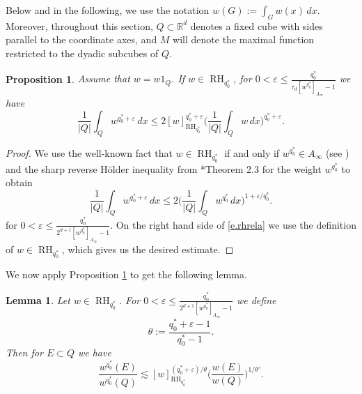 \documentclass[11pt,reqno]{amsart}
\theoremstyle{plain} %
\newtheorem{lemma}[equation]{Lemma}
\newtheorem{proposition}[equation]{Proposition}
\newcommand{\1}{ \mathbbm{1}}   %
\theoremstyle{definition}
\theoremstyle{remark}
\numberwithin{equation}{section}
\begin{document}
Below and in the following, we use the notation $w(G):=\int_Gw(x)\,dx$. Moreover, throughout this section, $Q\subset \mathbb{R}^d$ denotes a fixed cube with sides parallel to the coordinate axes, and $M$ will denote the maximal function restricted to the dyadic subcubes of $Q$.  

\begin{proposition}
\label{prop:srH}
    Assume that $w=w 1_Q$. If $w\in \operatorname{RH}_{q_0^*}$, for $0 < \varepsilon \leq \frac{q_0^*}{\tau_{d} [w^{q_0^*}]_{A_{\infty}}-1 }$ we have
    \begin{equation*}        
    \frac{1}{|Q|} \int_Q w^{q_0^* + \varepsilon} \, dx \le 2[w]_{\operatorname{RH}_{q_0^*}}^{q_0^*+\varepsilon}\Big( \frac{1}{|Q|} \int_Q w \, dx \Big)^{q_0^* + \varepsilon}.
    \end{equation*}
\end{proposition}




\begin{proof}
We use the well-known fact that $w\in \operatorname{RH}_{q_0^*}$ if and only if $w^{q_0^*}\in A_{\infty}$ (see \cite{SW}) and the sharp reverse H\"older inequality from \cite{HPR}*{Theorem 2.3} for the weight $w^{q_0^*}$ to obtain
 \begin{equation}\label{e.rhrela}      
    \frac{1}{|Q|} \int_Q w^{q_0^* + \varepsilon} \, dx \le 2\Big( \frac{1}{|Q|} \int_Q w^{q_0^*} \, dx \Big)^{1 + \varepsilon/q_0^*}.
    \end{equation}
for $0<\varepsilon \leq \frac{q_0^*}{2^{d+1}[w^{q_0^*}]_{A_{\infty}}-1} $. On the right hand side of \eqref{e.rhrela} we use the definition of $w\in \operatorname{RH}_{q_0^*}$, which gives us the desired estimate.
\end{proof}

We now apply Proposition \ref{prop:srH} to get the following lemma.

\begin{lemma}
Let $w\in \operatorname{RH}_{q_0^*}$. 
For  $0 < \varepsilon \leq \frac{q_0^*}{2^{d+1} [w^{q_0^*}]_{A_{\infty}}-1 }$ we define
\begin{equation}
\label{eq:alpha}
\theta:=\frac{q_0^*+\varepsilon-1}{q_0^*-1}.
\end{equation}
Then for $E\subset Q$  we have
\begin{equation}\label{e.claimneedsproving}
\frac{w^{q_0^*}(E)}{w^{q_0^*}(Q)}\lesssim [w]_{\operatorname{RH}_{q_0^*}}^{(q_0^*+\varepsilon)/\theta}\Big(\frac{w(E)}{w(Q)}\Big)^{1/\theta'}.
\end{equation}
\end{lemma}
\end{document}

